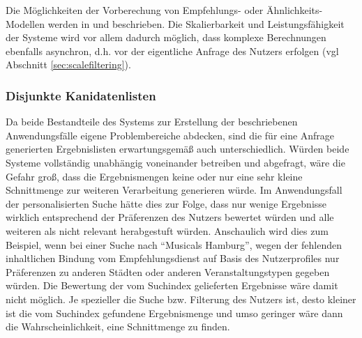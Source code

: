 Die Möglichkeiten der Vorberechung von Empfehlungs- oder Ähnlichkeits-Modellen werden in \citep{linden03} und \citep{Das07} beschrieben. Die Skalierbarkeit und Leistungsfähigkeit der Systeme wird vor allem dadurch möglich, dass komplexe Berechnungen ebenfalls asynchron, d.h. vor der eigentliche Anfrage des Nutzers erfolgen (vgl Abschnitt \ref{sec:scalefiltering}).

\subsubsection{Disjunkte Kanidatenlisten}\label{sec:disjunctcanidates}



Da beide Bestandteile des Systems zur Erstellung der beschriebenen Anwendungsfälle eigene Problembereiche abdecken, sind die für eine Anfrage generierten Ergebnislisten erwartungsgemäß auch unterschiedlich. Würden beide Systeme vollständig unabhängig voneinander betreiben und abgefragt, wäre die Gefahr groß, dass die Ergebnismengen keine oder nur eine sehr kleine Schnittmenge zur weiteren Verarbeitung generieren würde. Im Anwendungsfall der personalisierten Suche hätte dies zur Folge, dass nur wenige Ergebnisse wirklich entsprechend der Präferenzen des Nutzers bewertet würden und alle weiteren als nicht relevant herabgestuft würden. Anschaulich wird dies zum Beispiel, wenn bei einer Suche nach ``Musicals Hamburg'', wegen der fehlenden inhaltlichen Bindung vom Empfehlungsdienst auf Basis des Nutzerprofiles nur Präferenzen zu anderen Städten oder anderen Veranstaltungstypen gegeben würden. Die Bewertung der vom Suchindex gelieferten Ergebnisse wäre damit nicht möglich. Je spezieller die Suche bzw. Filterung des Nutzers ist, desto kleiner ist die vom Suchindex gefundene Ergebnismenge und umso geringer wäre dann die Wahrscheinlichkeit, eine Schnittmenge zu finden.

